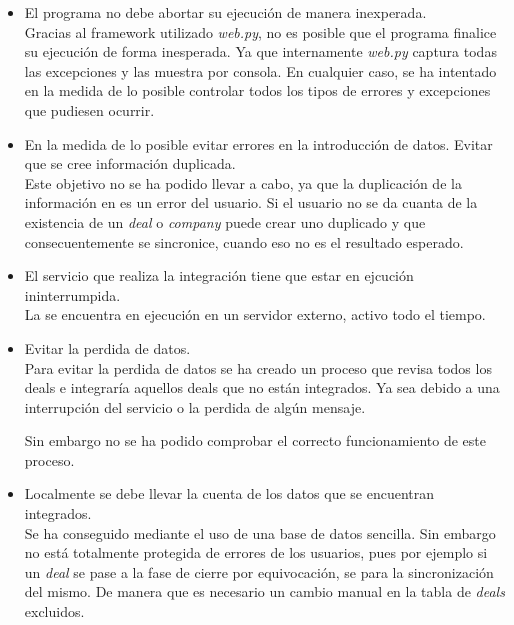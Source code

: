 \begin{itemize}
	\item El programa no debe abortar su ejecución de manera inexperada.\\
	
	Gracias al framework utilizado \textit{web.py}, no es posible que el programa finalice su ejecución de forma inesperada. 
	Ya que internamente \textit{web.py} captura todas las excepciones y las muestra por consola. En cualquier caso, se ha intentado en la medida de lo posible controlar todos los tipos de errores y excepciones que pudiesen ocurrir.
	
	\item En la medida de lo posible evitar errores en la introducción de datos. Evitar que se cree información duplicada.\\
	
	Este objetivo no se ha podido llevar a cabo, ya que la duplicación de la información en \hs{} es un error del usuario. Si el usuario no se da cuanta de la existencia de un \textit{deal} o \textit{company} puede crear uno duplicado y que consecuentemente se sincronice, cuando eso no es el resultado esperado.
	
	
	\item El servicio que realiza la integración tiene que estar en ejcución ininterrumpida.\\
	
	La \iface{} se encuentra en ejecución en un servidor externo, activo todo el tiempo.
	
	\item Evitar la perdida de datos.\\
	
	Para evitar la perdida de datos se ha creado un proceso que revisa todos los deals e integraría aquellos deals que no están integrados. 
	Ya sea debido a una interrupción del servicio o la perdida de algún mensaje.
	
	Sin embargo no se ha podido comprobar el correcto funcionamiento de este proceso.
	\item Localmente se debe llevar la cuenta de los datos que se encuentran integrados.\\
	
	Se ha conseguido mediante el uso de una base de datos sencilla.
	Sin embargo no está totalmente protegida de errores  de los usuarios, pues por ejemplo si un \textit{deal} se pase a la fase de cierre por equivocación, se para la sincronización del mismo.
	De manera que es necesario un cambio manual en la tabla de \textit{deals} excluidos.
	

\end{itemize}
